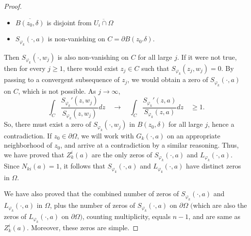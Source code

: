 \documentclass[11pt, reqno]{amsart}
\numberwithin{equation}{section}
\newcommand{\ov}{\overline}
\newcommand{\Om}{\Omega}
\begin{document}
\begin{proof}
		\begin{itemize}
			\item[(i)] $\overline{B(z_0,\delta)}$ is disjoint from $\ov{U_i\cap \Om}$
			\item[(ii)] $S_{\varphi_k}(\cdot,a)$ is non-vanishing on $C=\partial B(z_0.\delta)$. 
		\end{itemize}
		
		\noindent Then $S_{\varphi_k}(\cdot,w_j)$ is also non-vanishing on $C$ for all large $j$. If it were not true, then for every $j \ge 1$, there would exist $z_j\in C$ such that $S_{\varphi_k}(z_j,w_j) = 0$. By passing to a convergent subsequence of $z_j$, we would obtain a zero of $S_{\varphi_k}(\cdot,a)$ on $C$, which is not possible. As $j\rightarrow\infty$,
		\[
		\int_{C}\frac{{S_{\varphi_k}}'(z,w_j)}{S_{\varphi_k}(z,w_j)} dz
		\quad
		\rightarrow
		\quad
		\int_{C}\frac{{S_{\varphi_k}}'(z,a)}{S_{\varphi_k}(z,a)} dz
		\quad
		\geq 1.
		\]
		So, there must exist a zero of $S_{\varphi_k}(\cdot,w_j)$ in $B(z_0,\delta)$ for all large $j$, hence a contradiction. If $z_0\in\partial\Om$, we will work with $G_k(\cdot,a)$ on an appropriate neighborhood of $z_0$, and arrive at a contradiction by a similar reasoning. Thus, we have proved that $Z^i_k(a)$ are the only zeros of $S_{\varphi_k}(\cdot,a)$ and $L_{\varphi_k}(\cdot,a)$. Since $N_{ki}(a) = 1$, it follows that $S_{\varphi_k}(\cdot,a)$ and $L_{\varphi_k}(\cdot,a)$ have distinct zeros in $\Om$. 
		
		\medskip
		
		We have also proved that the combined number of zeros of $S_{\varphi_k}(\cdot, a)$ and $L_{\varphi_k}(\cdot,a)$ in $\Om$, plus the number of zeros of  $S_{\varphi_k}(\cdot,a)$ on $\partial\Om$ $($which are also the zeros of $L_{\varphi_k}(\cdot,a)$ on $\partial\Om)$, counting multiplicity, equals $n-1$, and are same as $Z_{k}^i(a)$. Moreover, these zeros are simple.
		
		\medskip
		

\end{proof}
\end{document}
